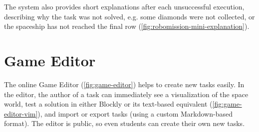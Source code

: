 The system also provides short explanations after each unsuccessful execution,
describing why the task was not solved,
e.g. some diamonds were not collected,
or the spaceship has not reached the final row
(\cref{fig:robomission-mini-explanation}).


\section{Game Editor}  %
\label{sec:robomission.task-editor}

The online Game Editor (\cref{fig:game-editor})
helps to create new tasks easily.
In the editor, the author of a task can immediately see a visualization of the
space world,
test a solution in either Blockly or its text-based equivalent %
(\cref{fig:game-editor-vim}),
and import or export tasks (using a custom Markdown-based format).
The editor is public, so even students can create their own new tasks.


